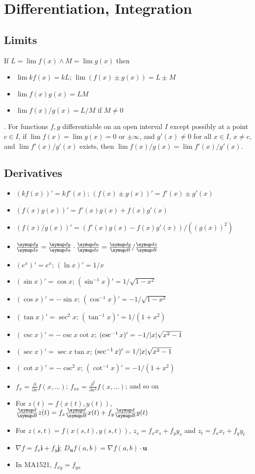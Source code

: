 \documentclass{slnotes}
\DeclarePairedDelimiter\abs{\lvert}{\rvert}%
\begin{document}
\chapter{Differentiation, Integration}
\section{Limits}
If \(L = \lim f(x) \land M = \lim g(x)\) then \begin{itemize}
\item \(\lim kf(x) = kL\); \(\lim (f(x) \pm g(x)) = L \pm M\)
\item \(\lim f(x)g(x) = LM\)
\item \(\lim f(x)/g(x) = L/M\) if \(M \neq 0\)
\end{itemize}

. For functions \(f, g\) differentiable on an open interval \(I\) except possibly at a point \(c \in I\), if \(\lim f(x) = \lim g(x) = 0\) or \(\pm\infty\), and \(g'(x) \neq 0\) for all \(x \in I\), \(x \neq c\), and \(\lim f'(x)/g'(x)\) exists, then \(\lim f(x)/g(x) = \lim f'(x)/g'(x)\).

\section{Derivatives}
\begin{itemize}
\item \((kf(x))' = kf'(x)\); \((f(x) \pm g(x))' = f'(x) \pm g'(x)\)
\item \((f(x)g(x))' = f'(x)g(x) + f(x)g'(x)\)
\item \((f(x)/g(x))' = (f'(x)g(x)-f(x)g'(x))/((g(x))^2)\)
\item \(\sldd{y}{x} = \sldd{y}{u} \cdot \sldd{u}{x} = \sldd{y}{t}/\sldd{x}{t}\)
\item \((e^x)' = e^x\); \((\ln x)' = 1/x\)
\item \((\sin x)' = \cos x\); \((\sin^{-1} x)' = 1/\sqrt{1-x^2}\)
\item \((\cos x)' = -\sin x\); \((\cos^{-1} x)' = -1/\sqrt{1-x^2}\)
\item \((\tan x)' = \sec^2 x\); \((\tan^{-1} x)' = 1/(1+x^2)\)
\item \((\csc x)' = -\csc x \cot x\); \((\csc^{-1} x)' = -1/\abs{x}\sqrt{x^2-1}\)
\item \((\sec x)' = \sec x \tan x\); \((\sec^{-1} x)' = 1/\abs{x}\sqrt{x^2-1}\)
\item \((\cot x)' = -\csc^2 x\); \((\cot^{-1} x)' = -1/(1+x^2)\)
\item \(f_x = \frac{\partial}{\partial x} f(x, \hdots)\); \(f_{xx} = \frac{\partial^2}{\partial x^2} f(x, \hdots)\); and so on
\item For \(z(t) = f(x(t), y(t))\),\\\(\sldd{}{t} z(t) = f_x \sldd{}{t} x(t) + f_y \sldd{}{t} y(t)\)
\item For \(z(s, t) = f(x(s, t), y(s, t))\), \(z_s = f_xx_s + f_yy_s\) and \(z_t = f_xx_t + f_yy_t\)
\item \(\nabla f = f_x\mathbf{i} + f_y\mathbf{j}\); \(D_{\mathbf{u}}f(a, b) = \nabla f(a, b)\cdot\mathbf{u}\)
\item In MA1521, \(f_{xy} = f_{yx}\)
\end{itemize}
\end{document}
